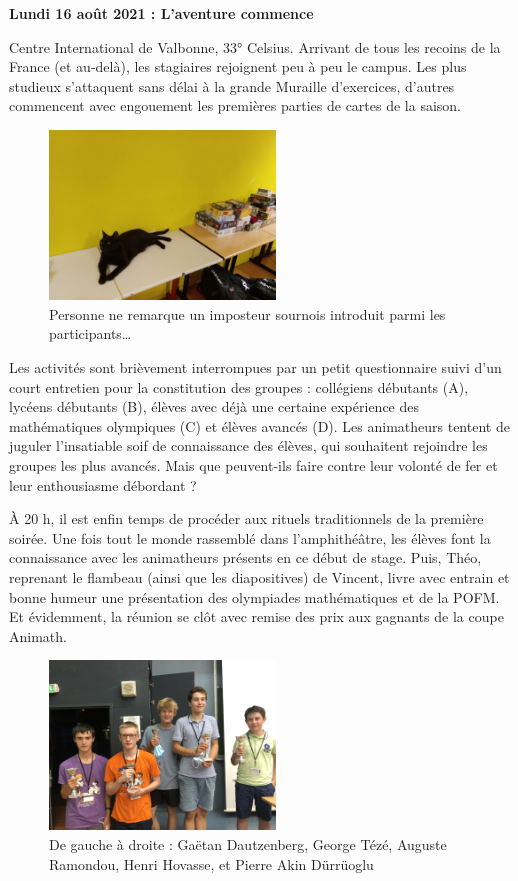 \begin{center}
{\textbf{Lundi 16 août 2021 : L’aventure commence}}
\end{center}
\vspace{2mm}

Centre International de Valbonne, 33° Celsius. Arrivant de tous les recoins de la France (et au-delà), les stagiaires rejoignent peu à peu le campus. Les plus studieux s’attaquent sans délai à la grande Muraille d’exercices, d’autres commencent avec engouement les premières parties de cartes de la saison.

\begin{figure}[H]
\centering\includegraphics[width=6cm]{CR-16-0.jpg}
\caption{Personne ne remarque un imposteur sournois introduit parmi les participants…}
\end{figure}

Les activités sont brièvement interrompues par un petit questionnaire suivi d’un court entretien pour la constitution des groupes : collégiens débutants (A), lycéens débutants (B), élèves avec déjà une certaine expérience des mathématiques olympiques (C) et élèves avancés (D). Les animatheurs tentent de juguler l’insatiable soif de connaissance des élèves, qui souhaitent rejoindre les groupes les plus avancés. Mais que peuvent-ils faire contre leur volonté de fer et leur enthousiasme débordant ?

À 20 h, il est enfin temps de procéder aux rituels traditionnels de la première soirée. Une fois tout le monde rassemblé dans l’amphithéâtre, les élèves font la connaissance avec les animatheurs présents en ce début de stage. Puis, Théo, reprenant le flambeau (ainsi que les diapositives) de Vincent, livre avec entrain et bonne humeur une présentation des olympiades mathématiques et de la POFM. Et évidemment, la réunion se clôt avec remise des prix aux gagnants de la coupe Animath.

\begin{figure}[H]
\centering\includegraphics[width=6cm]{CR-16-1.jpg}
\caption{De gauche à droite : Gaëtan Dautzenberg, George Tézé, Auguste Ramondou, Henri Hovasse, et Pierre Akin Dürrüoglu}
\end{figure}


